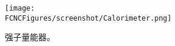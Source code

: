 \begin{figure}[htb]
\centering
\texttt{[image: \\FCNCFigures/screenshot/Calorimeter.png]}
\caption{强子量能器。}
\label{fig:Calorimeter}
\end{figure}
